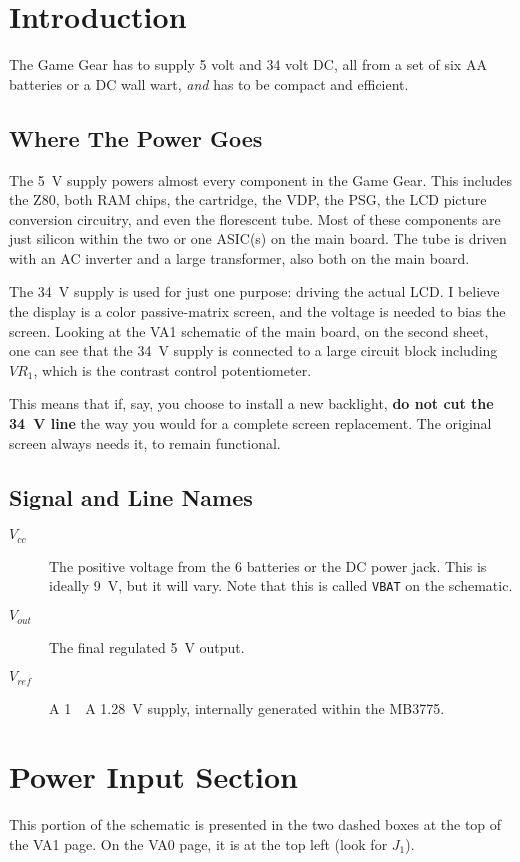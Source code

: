 \documentclass{article}
\newcommand{\Vcc}{$V_{cc}$}
\newcommand{\Vout}{$V_{out}$}
\newcommand{\Vref}{$V_{ref}$}
\newcommand{\model}{\textsf}
\begin{document}
\section{Introduction}
The Game Gear has to supply 5 volt and 34 volt DC, all from a set of
six AA batteries or a DC wall wart, \textit{and} has to be compact and
efficient.

\subsection{Where The Power Goes}
The \qty{5}{\volt} supply powers almost every component in the Game
Gear. This includes the \model{Z80}, both RAM chips, the cartridge,
the VDP, the PSG, the LCD picture conversion circuitry, and even the
florescent tube. Most of these components are just silicon within the
two or one ASIC(s) on the main board. The tube is driven with an AC
inverter and a large transformer, also both on the main board.

The \qty{34}{\volt} supply is used for just one purpose: driving the
actual LCD. I believe the display is a color passive-matrix screen,
and the voltage is needed to bias the screen. Looking at the
\model{VA1} schematic of the main board, on the second sheet, one can
see that the \qty{34}{\volt} supply is connected to a large circuit
block including $VR_1$, which is the contrast control potentiometer.

This means that if, say, you choose to install a new backlight,
\textbf{do not cut the \qty{34}{\volt} line} the way you would for a
complete screen replacement. The original screen always needs it, to
remain functional.

\subsection{Signal and Line Names}
\begin{description}
\item[\Vcc{}] The positive voltage from the 6 batteries or the DC power
  jack. This is ideally \qty{9}{\volt}, but it will vary. Note that
  this is called \texttt{VBAT} on the schematic.
\item[\Vout{}] The final regulated \qty{5}{\volt} output.
\item[\Vref{}] A \qty{1}{\milli{}A} \qty{1.28}{\volt} supply,
  internally generated within the \model{MB3775}.
\end{description}

\section{Power Input Section}
This portion of the schematic is presented in the two dashed boxes at
the top of the \model{VA1} page. On the \model{VA0} page, it is at the
top left (look for $J_1$).
\end{document}

